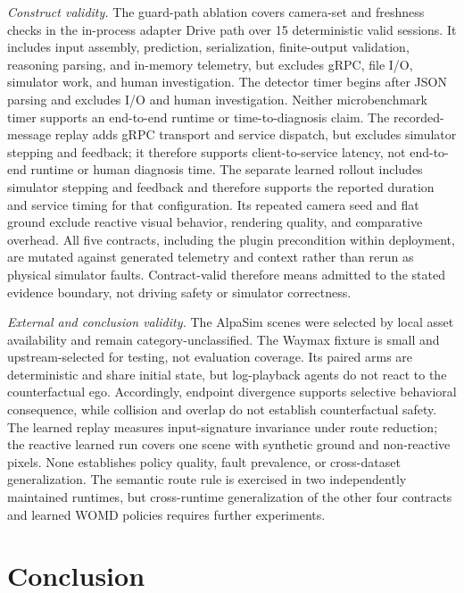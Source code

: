 \documentclass[a4paper,10pt,conference]{ieeeconf}
\begin{document}
\emph{Construct validity.} The guard-path ablation covers camera-set and
freshness checks in the in-process adapter Drive path over 15 deterministic valid
sessions. It includes input assembly, prediction, serialization, finite-output
validation, reasoning parsing, and in-memory telemetry, but excludes gRPC, file I/O,
simulator work, and human investigation. The detector timer begins after JSON parsing
and excludes I/O and human investigation. Neither microbenchmark timer supports an
end-to-end runtime or time-to-diagnosis claim. The recorded-message replay adds gRPC
transport and service dispatch, but excludes simulator stepping and feedback; it
therefore supports client-to-service latency, not end-to-end runtime or human
diagnosis time. The separate learned rollout includes simulator stepping and feedback
and therefore supports the reported duration and service timing for that configuration.
Its repeated camera seed and flat ground exclude reactive visual behavior, rendering
quality, and comparative overhead. All five contracts, including the plugin
precondition within deployment, are mutated against generated telemetry and context
rather than rerun as physical simulator faults. Contract-valid therefore means admitted
to the stated evidence boundary, not driving safety or simulator correctness.

\emph{External and conclusion validity.} The AlpaSim scenes were selected by local
asset availability and remain category-unclassified. The Waymax fixture is small and
upstream-selected for testing, not evaluation coverage. Its paired arms are
deterministic and share initial state, but log-playback agents do not react to the
counterfactual ego. Accordingly, endpoint divergence supports selective behavioral
consequence, while collision and overlap do not establish counterfactual safety. The
learned replay measures input-signature invariance under route reduction; the reactive
learned run covers one scene with synthetic ground and non-reactive pixels. None
establishes policy quality, fault prevalence, or cross-dataset generalization. The
semantic route rule is exercised in two independently maintained runtimes, but
cross-runtime generalization of the other four contracts and learned WOMD policies
requires further experiments.

\section{Conclusion}
\end{document}
